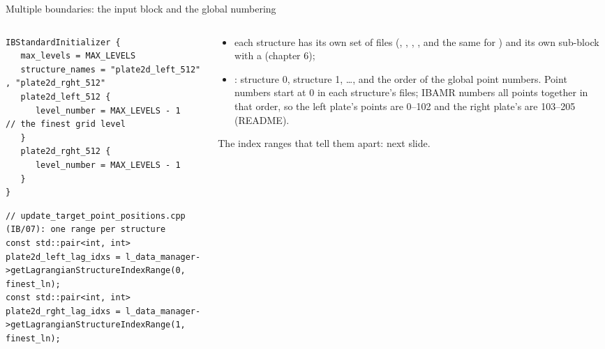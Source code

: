 \documentclass[aspectratio=169,11pt]{beamer}
\begin{document}
\begin{frame}[fragile]{Multiple boundaries: the input block and the global numbering}
\label{fr:multi2}
\begin{columns}[T,onlytextwidth]
\begin{column}{0.5\textwidth}
\begin{lstlisting}[style=input]
IBStandardInitializer {
   max_levels = MAX_LEVELS
   structure_names = "plate2d_left_512" , "plate2d_rght_512"
   plate2d_left_512 {
      level_number = MAX_LEVELS - 1        // the finest grid level
   }
   plate2d_rght_512 {
      level_number = MAX_LEVELS - 1
   }
}
\end{lstlisting}
\begin{lstlisting}[style=cpptiny]
// update_target_point_positions.cpp (IB/07): one range per structure
const std::pair<int, int> plate2d_left_lag_idxs = l_data_manager->getLagrangianStructureIndexRange(0, finest_ln);
const std::pair<int, int> plate2d_rght_lag_idxs = l_data_manager->getLagrangianStructureIndexRange(1, finest_ln);
\end{lstlisting}
\end{column}
\begin{column}{0.48\textwidth}
\footnotesize
\begin{itemize}
  \item each structure has its own set of files (, , , , and the same for ) and its own sub-block with a  (chapter 6);
  \item {}: structure 0, structure 1, \ldots, and the order of the global point numbers. Point numbers start at 0 in each structure's files; IBAMR numbers all points together in that order, so the left plate's points are 0--102 and the right plate's are 103--205 (README).
\end{itemize}
\footnotesize The index ranges that tell them apart: next slide.
\end{column}
\end{columns}
\end{frame}
\end{document}
